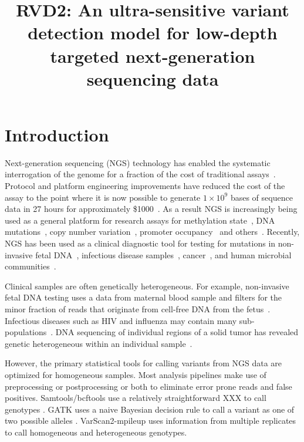 \documentclass[11pt,reqno]{amsart}
\title[RVD2]{RVD2: An ultra-sensitive variant detection model for low-depth targeted next-generation sequencing data}
\author{}
\begin{document}
\maketitle

\section{Introduction}
\citep{Ferretti:2013hp}

Next-generation sequencing (NGS) technology has enabled the systematic interrogation of the genome for a fraction of the cost of traditional assays~\citep{Koboldt:2013kw}. Protocol and platform engineering improvements have reduced the cost of the assay to the point where it is now possible to generate $1\times10^9$ bases of sequence data in 27 hours for approximately \$1000~\citep{Quail:2012hf}. As a result NGS is increasingly being used as a general platform for research assays for methylation state~\citep{Laird}, DNA mutations~\citep{Consortium:2013co}, copy number variation~\citep{Alkan:2009cr}, promoter occupancy~\citep{Ouyang:2009hc} and others~\citep{Rivera:2013ee}. Recently, NGS has been used as a clinical diagnostic tool for testing for mutations in non-invasive fetal DNA~\citep{Kitzman:2012hea}, infectious disease samples~\citep{Capobianchi:2012em}, cancer~\citep{Navin:2010gu}, and human microbial communities~\citep{Consortium:2013iz}. 

Clinical samples are often genetically heterogeneous. For example, non-invasive fetal DNA testing uses a data from maternal blood sample and filters for the minor fraction of reads that originate from cell-free DNA from the fetus~\citep{Fan:2008di}. Infectious diseases such as HIV and influenza may contain many sub-populations~\citep{Flaherty:2011ja, Ghedin:2010ie}. DNA sequencing of individual regions of a solid tumor has revealed genetic heterogeneous within an individual sample~\citep{Navin:2010gu}.  

However, the primary statistical tools for calling variants from NGS data are optimized for homogeneous samples. Most analysis pipelines make use of preprocessing or postprocessing or both to eliminate error prone reads and false positives. Samtools/bcftools use a relatively straightforward XXX to call genotypes \cite{}. GATK uses a naive Bayesian decision rule to call a variant as one of two possible alleles \cite{McKenna2010}. VarScan2-mpileup uses information from multiple replicates to call homogeneous and heterogeneous genotypes.
\end{document}
